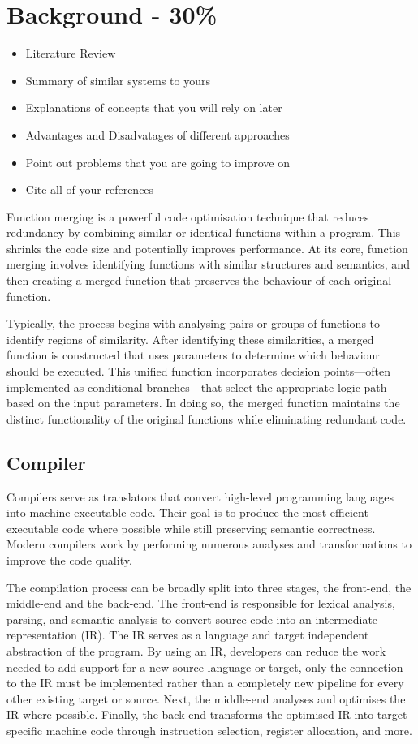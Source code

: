 \chapter{Background - 30\%}


\begin{itemize}
    \item Literature Review
    \item Summary of similar systems to yours
    \item Explanations of concepts that you will rely on later
    \item Advantages and Disadvatages of different approaches
    \item Point out problems that you are going to improve on
    \item Cite all of your references
\end{itemize}

Function merging is a powerful code optimisation technique that reduces redundancy by combining similar or identical functions within a program. This shrinks the code size and potentially improves performance. At its core, function merging involves identifying functions with similar structures and semantics, and then creating a merged function that preserves the behaviour of each original function.

Typically, the process begins with analysing pairs or groups of functions to identify regions of similarity. After identifying these similarities, a merged function is constructed that uses parameters to determine which behaviour should be executed. This unified function incorporates decision points—often implemented as conditional branches—that select the appropriate logic path based on the input parameters. In doing so, the merged function maintains the distinct functionality of the original functions while eliminating redundant code.

\section{Compiler}
Compilers serve as translators that convert high-level programming languages into machine-executable code. Their goal is to produce the most efficient executable code where possible while still preserving semantic correctness. Modern compilers work by performing numerous analyses and transformations to improve the code quality.

The compilation process can be broadly split into three stages, the front-end, the middle-end and the back-end. The front-end is responsible for lexical analysis, parsing, and semantic analysis to convert source code into an intermediate representation (IR). The IR serves as a language and target independent abstraction of the program. By using an IR, developers can reduce the work needed to add support for a new source language or target, only the connection to the IR must be implemented rather than a completely new pipeline for every other existing target or source. Next, the middle-end analyses and optimises the IR where possible. Finally, the back-end transforms the optimised IR into target-specific machine code through instruction selection, register allocation, and more.

